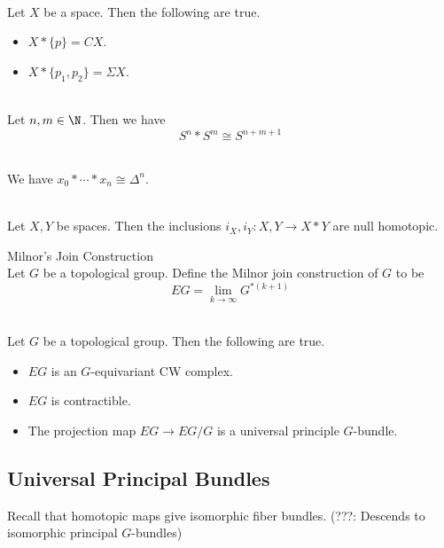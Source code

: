 \documentclass[a4paper]{article}
\begin{document}
\begin{eg}{}{}\\
Let $X$ be a space. Then the following are true. 
\begin{itemize}
\item $X\ast\{p\}=CX$. 
\item $X\ast\{p_1,p_2\}=\Sigma X$. 
\end{itemize}
\end{eg}

\begin{eg}{}{}\\
Let $n,m\in\N$. Then we have $$S^n\ast S^m\cong S^{n+m+1}$$
\end{eg}

\begin{eg}{}{}\\
We have $x_0\ast\cdots\ast x_n\cong\Delta^n$. 
\end{eg}

\begin{lmm}{}{}\\
Let $X,Y$ be spaces. Then the inclusions $i_X,i_Y:X,Y\to X\ast Y$ are null homotopic. 
\end{lmm}

\begin{defn}{Milnor's Join Construction}{}\\
Let $G$ be a topological group. Define the Milnor join construction of $G$ to be $$EG=\lim_{k\to\infty}G^{\ast(k+1)}$$
\end{defn}

\begin{lmm}{}{}\\
Let $G$ be a topological group. Then the following are true. 
\begin{itemize}
\item $EG$ is an $G$-equivariant CW complex. 
\item $EG$ is contractible. 
\item The projection map $EG\to EG/G$ is a universal principle $G$-bundle. 
\end{itemize}
\end{lmm}

\subsection{Universal Principal Bundles}
Recall that homotopic maps give isomorphic fiber bundles. (???: Descends to isomorphic principal $G$-bundles)
\end{document}
